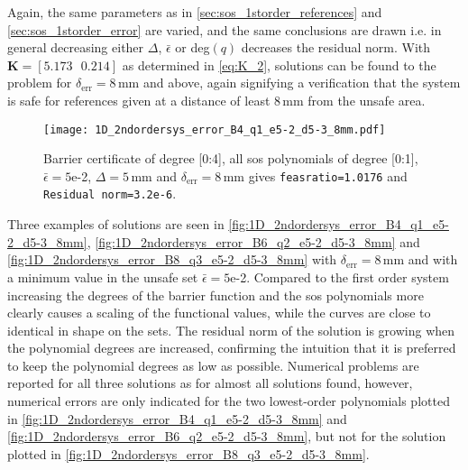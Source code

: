 Again, the same parameters as in \autoref{sec:sos_1storder_references} and \ref{sec:sos_1storder_error} are varied, and the same conclusions are drawn i.e. in general decreasing either  $\Delta$, $\bar{\epsilon}$ or deg$(q)$ decreases the residual norm. With  $\textbf{K}=[5.173  \,\,\,\,  0.214]$ as determined in \autoref{eq:K_2}, solutions can be found to the problem for $\delta_\text{err}=8$\,mm and above, again signifying a verification that the system is safe for references given at a distance of least 8\,mm from the unsafe area.

\begin{figure}[H]
	\centering
	\texttt{[image: 1D\_2ndordersys\_error\_B4\_q1\_e5-2\_d5-3\_8mm.pdf]}
	\caption{Barrier certificate of degree [0:4], all \gls{sos} polynomials of degree [0:1], $\bar{\epsilon}=5$e-2, $\Delta=5$\,mm and $\delta_\text{err}=8$\,mm gives \texttt{feasratio=1.0176} and \texttt{Residual norm=3.2e-6}.}
	\label{fig:1D_2ndordersys_error_B4_q1_e5-2_d5-3_8mm}
\end{figure}



Three examples of solutions are seen in \autoref{fig:1D_2ndordersys_error_B4_q1_e5-2_d5-3_8mm}, \ref{fig:1D_2ndordersys_error_B6_q2_e5-2_d5-3_8mm} and \ref{fig:1D_2ndordersys_error_B8_q3_e5-2_d5-3_8mm} with $\delta_\text{err}=8$\,mm and with a minimum value in the unsafe set $\bar{\epsilon}=5$e-2. Compared to the first order system increasing the degrees of the barrier function and the \gls{sos} polynomials  more clearly causes a scaling of the functional values, while the curves are close to identical in shape on the sets. The residual norm of the solution is growing when the polynomial degrees are increased, confirming the intuition that it is preferred to keep the polynomial degrees as low as possible. Numerical problems are reported for all three solutions as for almost all solutions found, however, numerical errors are only indicated for the two lowest-order polynomials plotted in \autoref{fig:1D_2ndordersys_error_B4_q1_e5-2_d5-3_8mm} and \ref{fig:1D_2ndordersys_error_B6_q2_e5-2_d5-3_8mm}, but not for the solution plotted in \autoref{fig:1D_2ndordersys_error_B8_q3_e5-2_d5-3_8mm}.

